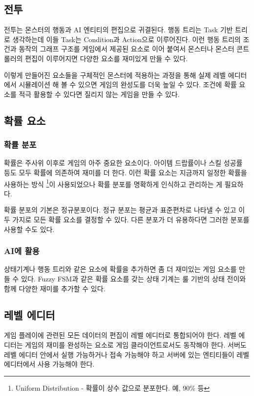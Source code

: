 \documentclass[chapter,kosection, 10.5pt, romanfixed, a4paper]{oblivoir}
\begin{document}
\subsection{전투}

전투는 몬스터의 행동과 AI 엔티티의 편집으로 귀결된다. 행동 트리는 Task 기반 트리로 생각하는데
이들 Task는 Condition과 Action으로 이루어진다. 이런 행동 트리의 조건과 동작의 그래프 구조를
게임에서 제공된 요소로 이어 붙여서 몬스터나 몬스터 콘트롤러의 편집이 이루어지면 다양한 요소를
재미있게 만들 수 있다. 

이렇게 만들어진 요소들을 구체적인 몬스터에 적용하는 과정을 통해 실제 레벨 에디터에서 
시뮬레이션 해 볼 수 있으면 게임의 완성도를 더욱 높일 수 있다. 조건에 확률 요소를 적극 
활용할 수 있다면 질리지 않는 게임을 만들 수 있다. 

\subsection{확률 요소}

\subsubsection{확률 분포}
확률은 주사위 이후로 게임의 아주 중요한 요소이다. 아이템 드랍률이나 스킬 성공률 등도 모두 
확률에 의존하여 재미를 더 한다. 이런 확률 요소는 지금까지 일정한 확률을 사용하는 방식
\footnote{Uniform Distribution - 확률이 상수 값으로 분포한다. 예, 90\% 등}이 사용되었으나 
확률 분포를 명확하게 인식하고 관리하는 게 필요하다. 

확률 분포의 기본은 정규분포이다. 정규 분포는 평균과 표준편차로 나타낼 수 있고 이 두 가지로 
모든 확률 요소를 결정할 수 있다. 다른 분포가 더 유용하다면 그러한 분포를 사용할 수도 있다. 

\subsubsection{AI에 활용}

상태기계나 행동 트리와 같은 요소에 확률을 추가하면 좀 더 재미있는 게임 요소를 만들 수 있다. 
Fuzzy FSM과 같은 확률 요소를 갖는 상태 기계는 룰 기반의 상태 전이와 함께 다양한 재미를 추가할 수 있다. 

\subsection{레벨 에디터}

게임 플레이에 관련된 모든 데이터의 편집이 레벨 에디터로 통합되어야 한다. 레벨 에디터는 게임의 
재미를 완성하는 요소로 게임 클라이언트로서도 동작해야 한다. 서버도 레벨 에디터 안에서 실행 가능하거나
접속 가능해야 하고 서버에 있는 엔티티들이 레벨 에디터에서 사용 가능해야 한다. 
\end{document}
